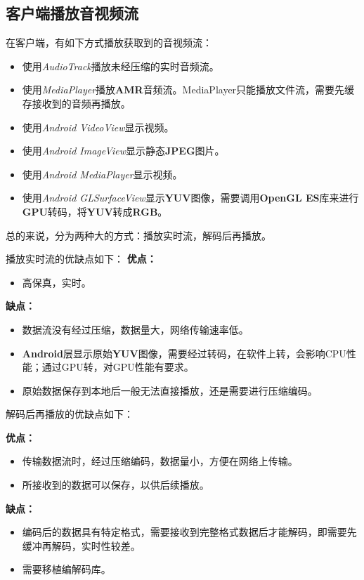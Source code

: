 \documentclass[11pt,a4paper]{article}
\begin{document}
\begin{CJK}{UTF8}{gbsn}
    \section{客户端播放音视频流}
    在客户端，有如下方式播放获取到的音视频流：
    \begin{itemize}
        \item 使用\emph{AudioTrack}播放未经压缩的实时音频流。
        \item 使用\emph{MediaPlayer}播放\textbf{AMR}音频流。MediaPlayer只能播放文件流，需要先缓存接收到的音频再播放。
        \item 使用\emph{Android VideoView}显示视频。
        \item 使用\emph{Android ImageView}显示静态\textbf{JPEG}图片。
        \item 使用\emph{Android MediaPlayer}显示视频。
        \item 使用\emph{Android GLSurfaceView}显示\textbf{YUV}图像，需要调用\textbf{OpenGL ES}库来进行\textbf{GPU}转码，将\textbf{YUV}转成\textbf{RGB}。
    \end{itemize}
    总的来说，分为两种大的方式：播放实时流，解码后再播放。\par
    播放实时流的优缺点如下：
    \textbf{优点：}
    \begin{itemize}
        \item 高保真，实时。
    \end{itemize}

    \textbf{缺点：}
    \begin{itemize}
        \item 数据流没有经过压缩，数据量大，网络传输速率低。
        \item \textbf{Android}层显示原始\textbf{YUV}图像，需要经过转码，在软件上转，会影响CPU性能；通过GPU转，对GPU性能有要求。
        \item 原始数据保存到本地后一般无法直接播放，还是需要进行压缩编码。
    \end{itemize}
    \par

    解码后再播放的优缺点如下：\par
    \textbf{优点：}
    \begin{itemize}
        \item 传输数据流时，经过压缩编码，数据量小，方便在网络上传输。
        \item 所接收到的数据可以保存，以供后续播放。
    \end{itemize}

    \textbf{缺点：}
    \begin{itemize}
        \item 编码后的数据具有特定格式，需要接收到完整格式数据后才能解码，即需要先缓冲再解码，实时性较差。
        \item 需要移植编解码库。
    \end{itemize}


\end{CJK}
\end{document}
